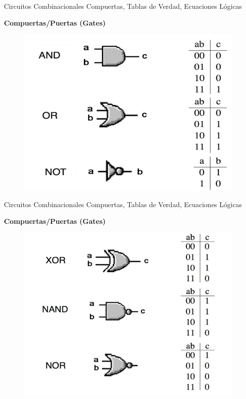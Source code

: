 \documentclass[aspectratio=169,compress]{beamer}
\begin{document}
\begin{footnotesize}
\begin{frame} {Circuitos Combinacionales} {Compuertas, Tablas de Verdad, Ecuaciones Lógicas}
\begin{center}\textbf{Compuertas/Puertas (Gates)}\end{center}
\begin{figure}
\includegraphics[scale=0.2]{images/compuertas.jpg} 
\end{figure}
\end{frame}


\begin{frame} {Circuitos Combinacionales} {Compuertas, Tablas de Verdad, Ecuaciones Lógicas}
\begin{center}\textbf{Compuertas/Puertas (Gates)}\end{center}
\begin{figure}
\includegraphics[scale=0.2]{images/compuertasx.jpg} 
\end{figure}
\end{frame}


\end{footnotesize}
\end{document}
